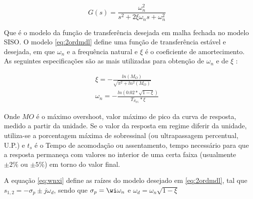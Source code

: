 \begin{equation} \label{eq:2ordmdl}
    G(s) = \frac{\omega^2_n}{s^2+2\xi \omega_ns +\omega^2_n}
\end{equation}

Que é o modelo da função de transferência desejada em malha 
fechada no modelo SISO. O modelo \ref{eq:2ordmdl} define uma função de transferência estável e desejada, em que $\omega_n$ e a frequência natural e $\xi$ é o coeficiente de amortecimento.
As seguintes especificações são as mais utilizadas para obtenção de $\omega_n$ e de $\xi$ :

\begin{equation} \label{eq:wnxi}
    \begin{split} 
        \xi=-\frac{ln\left( M_O \right)}{\sqrt{\pi^2+ln^2(M_O)}}\\
        \omega_n=-\frac{ln\left( 0.02*\sqrt{1-\xi} \right)}{T_{S_{2\%}}*\xi} 
    \end{split}
\end{equation}
    
Onde $MO$ é o máximo overshoot, valor máximo de pico da curva de resposta, medido a partir da unidade. Se o valor da resposta em regime diferir da unidade, utiliza-se a porcentagem máxima de sobressinal (ou ultrapassagem percentual, U.P.) e $t_s$ é o Tempo de acomodação ou assentamento, tempo necessário para que a resposta permaneça com valores no interior de uma certa faixa (usualmente $\pm2\%$ ou $\pm5\%$) em torno do valor final.

A equação \ref{eq:wnxi} define as raízes do modelo desejado em \ref{eq:2ordmdl}, tal que $s_{1,2}=-\sigma_p ±j\omega_d$, sendo que $\sigma_p = \wi\omega_n$ e $\omega_{d}=\omega_{n} \sqrt{1-\xi}$  
 
